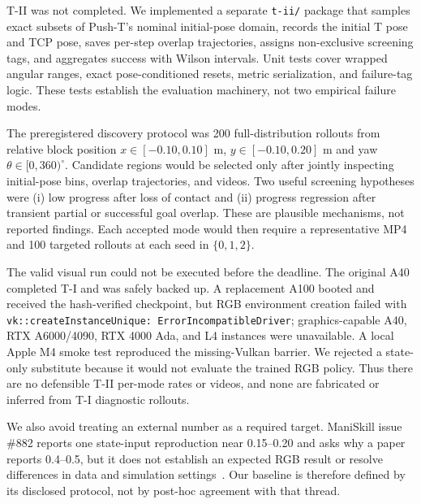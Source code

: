T-II was not completed. We implemented a separate \texttt{t-ii/} package that samples exact
subsets of Push-T's nominal initial-pose domain, records the initial T pose and TCP pose, saves
per-step overlap trajectories, assigns non-exclusive screening tags, and aggregates success with
Wilson intervals. Unit tests cover wrapped angular ranges, exact pose-conditioned resets, metric
serialization, and failure-tag logic. These tests establish the evaluation machinery, not two
empirical failure modes.

The preregistered discovery protocol was 200 full-distribution rollouts from relative block
position $x\in[-0.10,0.10]$ m, $y\in[-0.10,0.20]$ m and yaw $\theta\in[0,360)^\circ$. Candidate
regions would be selected only after jointly inspecting initial-pose bins, overlap trajectories,
and videos. Two useful screening hypotheses were (i) low progress after loss of contact and
(ii) progress regression after transient partial or successful goal overlap. These are plausible
mechanisms, not reported findings. Each accepted mode would then require a representative MP4 and
100 targeted rollouts at each seed in $\{0,1,2\}$.

The valid visual run could not be executed before the deadline. The original A40 completed T-I
and was safely backed up. A replacement A100 booted and received the hash-verified checkpoint, but
RGB environment creation failed with \texttt{vk::createInstanceUnique:
ErrorIncompatibleDriver}; graphics-capable A40, RTX A6000/4090, RTX 4000 Ada, and L4 instances
were unavailable. A local Apple M4 smoke test reproduced the missing-Vulkan barrier. We rejected
a state-only substitute because it would not evaluate the trained RGB policy. Thus there are no
defensible T-II per-mode rates or videos, and none are fabricated or inferred from T-I diagnostic
rollouts.

We also avoid treating an external number as a required target. ManiSkill issue \#882 reports one
state-input reproduction near 0.15--0.20 and asks why a paper reports 0.4--0.5, but it does not
establish an expected RGB result or resolve differences in data and simulation
settings~\cite{maniskill_issue882}. Our baseline is therefore defined by its disclosed protocol,
not by post-hoc agreement with that thread.
